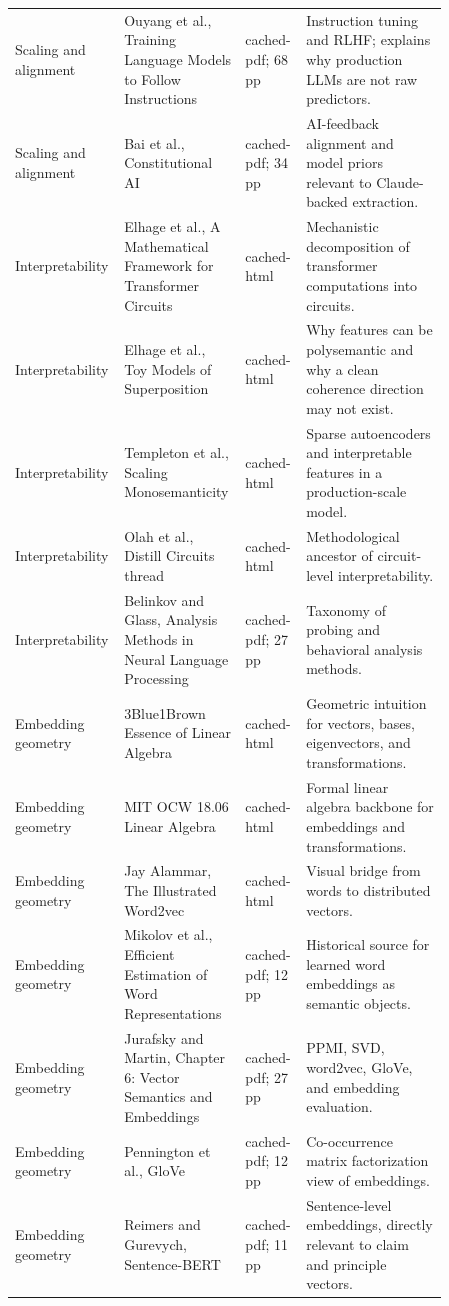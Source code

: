 \documentclass[11pt]{article}
\begin{document}
\begin{longtable}{p{0.16\linewidth}p{0.25\linewidth}p{0.13\linewidth}p{0.32\linewidth}}
Scaling and alignment & Ouyang et al., Training Language Models to Follow Instructions & cached-pdf; 68 pp & Instruction tuning and RLHF; explains why production LLMs are not raw predictors. \\
Scaling and alignment & Bai et al., Constitutional AI & cached-pdf; 34 pp & AI-feedback alignment and model priors relevant to Claude-backed extraction. \\
Interpretability & Elhage et al., A Mathematical Framework for Transformer Circuits & cached-html & Mechanistic decomposition of transformer computations into circuits. \\
Interpretability & Elhage et al., Toy Models of Superposition & cached-html & Why features can be polysemantic and why a clean coherence direction may not exist. \\
Interpretability & Templeton et al., Scaling Monosemanticity & cached-html & Sparse autoencoders and interpretable features in a production-scale model. \\
Interpretability & Olah et al., Distill Circuits thread & cached-html & Methodological ancestor of circuit-level interpretability. \\
Interpretability & Belinkov and Glass, Analysis Methods in Neural Language Processing & cached-pdf; 27 pp & Taxonomy of probing and behavioral analysis methods. \\
Embedding geometry & 3Blue1Brown Essence of Linear Algebra & cached-html & Geometric intuition for vectors, bases, eigenvectors, and transformations. \\
Embedding geometry & MIT OCW 18.06 Linear Algebra & cached-html & Formal linear algebra backbone for embeddings and transformations. \\
Embedding geometry & Jay Alammar, The Illustrated Word2vec & cached-html & Visual bridge from words to distributed vectors. \\
Embedding geometry & Mikolov et al., Efficient Estimation of Word Representations & cached-pdf; 12 pp & Historical source for learned word embeddings as semantic objects. \\
Embedding geometry & Jurafsky and Martin, Chapter 6: Vector Semantics and Embeddings & cached-pdf; 27 pp & PPMI, SVD, word2vec, GloVe, and embedding evaluation. \\
Embedding geometry & Pennington et al., GloVe & cached-pdf; 12 pp & Co-occurrence matrix factorization view of embeddings. \\
Embedding geometry & Reimers and Gurevych, Sentence-BERT & cached-pdf; 11 pp & Sentence-level embeddings, directly relevant to claim and principle vectors. \\

\end{longtable}
\end{document}
